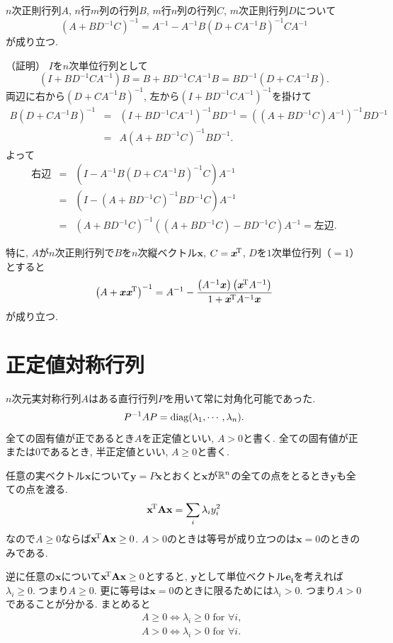 $n$次正則行列$A$, $n$行$m$列の行列$B$, $m$行$n$列の行列$C$, $m$次正則行列$D$について
$$\left(A+BD^{-1}C\right)^{-1}=A^{-1}-A^{-1}B\left(D+CA^{-1}B\right)^{-1}CA^{-1}$$
が成り立つ.

（証明）
$I$を$n$次単位行列として
\[
(I+BD^{-1}CA^{-1})B=B+BD^{-1}CA^{-1}B=BD^{-1}(D+CA^{-1}B).
\]
\pagebreak
両辺に右から$(D+CA^{-1}B)^{-1}$, 左から$(I+BD^{-1}CA^{-1})^{-1}$を掛けて
\begin{eqnarray*}
B(D+CA^{-1}B)^{-1}&=&(I+BD^{-1}CA^{-1})^{-1}BD^{-1}=((A+BD^{-1}C)A^{-1})^{-1}BD^{-1}\\
&=& A(A+BD^{-1}C)^{-1}BD^{-1}.
\end{eqnarray*}
よって
\begin{eqnarray*}
\text{右辺} &=& \left(I-A^{-1}B(D+CA^{-1}B)^{-1}C\right)A^{-1}\\
 &=& \left(I-\left(A+BD^{-1}C\right)^{-1}BD^{-1}C\right)A^{-1}\\
 &=& \left(A+BD^{-1}C\right)^{-1}\left(\left(A+BD^{-1}C\right)-BD^{-1}C\right)A^{-1}= \text{左辺}.
\end{eqnarray*}

特に, $A$が$n$次正則行列で$B$を$n$次縦ベクトル$\bm{x}$, $C={\bm{x}}^{\!\mathrm{T}}$, $D$を$1$次単位行列（$=1$）とすると
\begin{equation}\label{inv_A_xx}
\left(A+\bm{x}{\bm{x}}^{\!\mathrm{T}}\right)^{-1}=A^{-1}-\frac{\left(A^{-1}\bm{x}\right)\left({\bm{x}}^{\!\mathrm{T}}A^{-1}\right)}{1+{\bm{x}}^{\!\mathrm{T}}A^{-1}\bm{x}}
\end{equation}
が成り立つ.

\section{正定値対称行列}\label{pos_sym_matrix}
$n$次元実対称行列$A$はある直行行列$P$を用いて常に対角化可能であった.
$$P^{-1}AP=\mathop{\mathrm{diag}}\nolimits(\lambda_1, \cdots, \lambda_n).$$
全ての固有値が正であるとき$A$を正定値といい, $A > 0$と書く.
全ての固有値が正または$0$であるとき, 半正定値といい, $A \ge 0$と書く.

任意の実ベクトル$\bm{x}$について$\bm{y}=P\bm{x}$とおくと$\bm{x}$が$\mathbb{R}^n$の全ての点をとるとき$\bm{y}$も全ての点を渡る.
$${\mathbf{\boldsymbol{x}}}^{\!\mathrm{T}} \mathbf{\boldsymbol{A}} \mathbf{\boldsymbol{x}}=\sum_i \lambda_i y_i^2$$
なので$A \ge 0$ならば${\mathbf{\boldsymbol{x}}}^{\!\mathrm{T}} \mathbf{\boldsymbol{A}} \mathbf{\boldsymbol{x}} \ge 0$. $A>0$のときは等号が成り立つのは$\bm{x}=0$のときのみである.

逆に任意の$\bm{x}$について${\mathbf{\boldsymbol{x}}}^{\!\mathrm{T}} \mathbf{\boldsymbol{A}} \mathbf{\boldsymbol{x}} \ge 0$とすると,
$\bm{y}$として単位ベクトル$\bm{e_i}$を考えれば$\lambda_i \ge 0$. つまり$A \ge 0$.
更に等号は$\bm{x}=0$のときに限るためには$\lambda_i > 0$. つまり$A>0$であることが分かる.
まとめると
\begin{eqnarray*}
 && A \ge 0 \iff \lambda_i \ge 0 \mbox{ for } \forall i,
 \\
 && A>0 \iff \lambda_i > 0 \mbox{ for } \forall i.
\end{eqnarray*}

